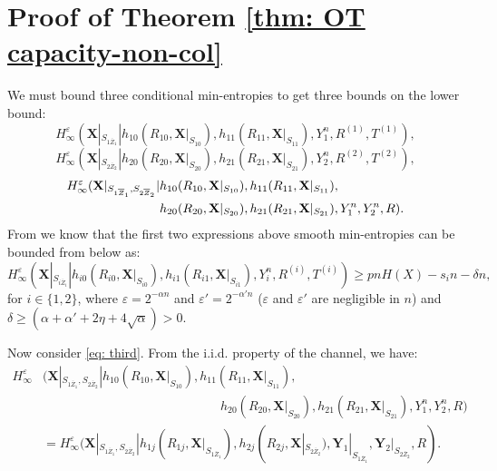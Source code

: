 \documentclass[runningheads]{llncs}
\newcommand{\parbreak}{ \vspace{0.3 em}}
\begin{document}
\section{Proof of Theorem \ref{thm: OT capacity-non-col}}\label{app: thm: OT capacity-non-col}
  We must bound three conditional min-entropies to get three bounds on the lower bound:
        \begin{equation}\label{eq: first}
            H^\varepsilon_{\infty}(\mathbf{X}|_{S_{1\overline{Z}_1}}|h_{10}(R_{10}, \mathbf{X}|_{S_{10}}), h_{11}(R_{11}, \mathbf{X}|_{S_{11}}), Y_1^n, R^{(1)}, T^{(1)}),
        \end{equation}
        \begin{equation}\label{eq: second}
            H^\varepsilon_{\infty}(\mathbf{X}|_{S_{2\overline{Z}_2}}|h_{20}(R_{20}, \mathbf{X}|_{S_{20}}), h_{21}(R_{21}, \mathbf{X}|_{S_{21}}), Y_2^n, R^{(2)}, T^{(2)}),
        \end{equation}
        \begin{align}\label{eq: third}
            H^\varepsilon_{\infty}(\mathbf{X}|_{S_{1\overline{Z}_1},S_{2\overline{Z}_2}}|&h_{10}(R_{10}, \mathbf{X}|_{S_{10}}), h_{11}(R_{11}, \mathbf{X}|_{S_{11}}),\notag\\ & h_{20}(R_{20}, \mathbf{X}|_{S_{20}}), h_{21}(R_{21}, \mathbf{X}|_{S_{21}}), Y_1^n,Y_2^n, R).
        \end{align}
From \cite{Winter1} we know that the first two expressions above smooth min-entropies can be bounded from below as:
\begin{equation}
    H^\varepsilon_{\infty}(\mathbf{X}|_{S_{i\overline{Z}_i}}|h_{i0}(R_{i0}, \mathbf{X}|_{S_{i0}}), h_{i1}(R_{i1}, \mathbf{X}|_{S_{i1}}), Y_i^n, R^{(i)}, T^{(i)})\geq pn H(X) - s_i n -\delta n,
\end{equation}
for $i\in\{1,2\}$, where $\varepsilon = 2^{-\alpha n}$ and  $\varepsilon' = 2^{-\alpha' n}$ ($\varepsilon$ and $\varepsilon'$ are negligible in $n$) and $\delta \geq (\alpha+\alpha' + 2\eta +4\sqrt{\alpha})> 0$.

\parbreak 
Now consider \eqref{eq: third}. From the i.i.d. property of the channel, we have:
  \begin{align*}
            H^\varepsilon_{\infty}&(\mathbf{X}|_{S_{1\overline{Z}_1},S_{2\overline{Z}_2}}|h_{10}(R_{10}, \mathbf{X}|_{S_{10}}), h_{11}(R_{11}, \mathbf{X}|_{S_{11}}),\\
            & \qquad\qquad\qquad\qquad\qquad\qquad\qquad h_{20}(R_{20}, \mathbf{X}|_{S_{20}}), h_{21}(R_{21}, \mathbf{X}|_{S_{21}}), Y_1^n,Y_2^n, R)\\
            & = H^\varepsilon_{\infty}(\mathbf{X}|_{S_{1\overline{Z}_1},S_{2\overline{Z}_2}}| h_{1j}(R_{1j},\mathbf{X}|_{S_{1\overline{Z}_1}}),   h_{2j}(R_{2j},\mathbf{X}|_{S_{2\overline{Z}_2}}),\mathbf{Y}_1|_{S_{1\overline{Z}_1}},\mathbf{Y}_2|_{S_{2\overline{Z}_2}}, R).
        \end{align*}
        
\end{document}
